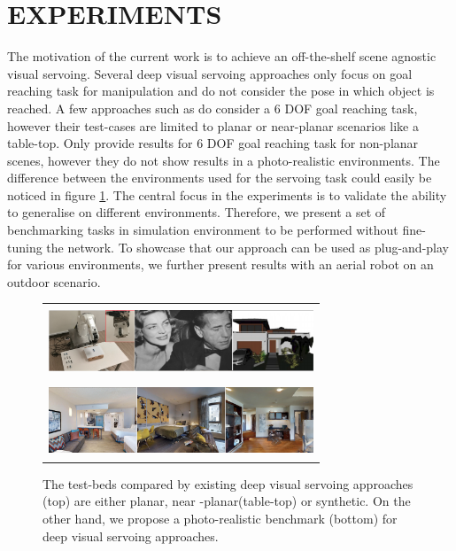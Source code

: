 \documentclass[letterpaper, 10 pt, conference]{ieeeconf}  %
\begin{document}
\section{EXPERIMENTS}
The motivation of the current work is to achieve an off-the-shelf scene agnostic visual servoing. Several deep visual servoing approaches \cite{sim2real,sim2real2,deepq,sefsupervised} only focus on goal reaching task for manipulation and do not consider the pose in which object is reached. A few approaches such as \cite{trainingdeepvs,siamesevs} do consider a 6 DOF goal reaching task, however their test-cases are limited to planar or near-planar scenarios like a table-top. Only \cite{photometricvs} provide results for 6 DOF goal reaching task for non-planar scenes, however they do not show results in a photo-realistic environments. The difference between the environments used for the servoing task could easily be noticed in figure \ref{fig:benchmark}.  The central focus in the experiments is to validate the ability to generalise on different environments. Therefore, we present a set of benchmarking tasks in simulation environment to be performed without fine-tuning the network. To showcase that our approach can be used as plug-and-play for various environments, we further present results with an aerial robot on an outdoor scenario. 

\begin{figure}
\begin{tabular}{c}    
  \includegraphics[width=7.9cm, height=2.1cm]{Dataset_images/bench_others_h.png} \\
  \includegraphics[width=7.9cm, height=2.1cm]{Dataset_images/bench_ours_h.png}
\end{tabular}
    \caption{The test-beds compared by existing deep visual servoing approaches (top) are either planar, near -planar(table-top) or synthetic. On the other hand, we propose a photo-realistic benchmark (bottom) for deep visual servoing approaches.}
    \label{fig:benchmark}
    
\end{figure}
\end{document}
